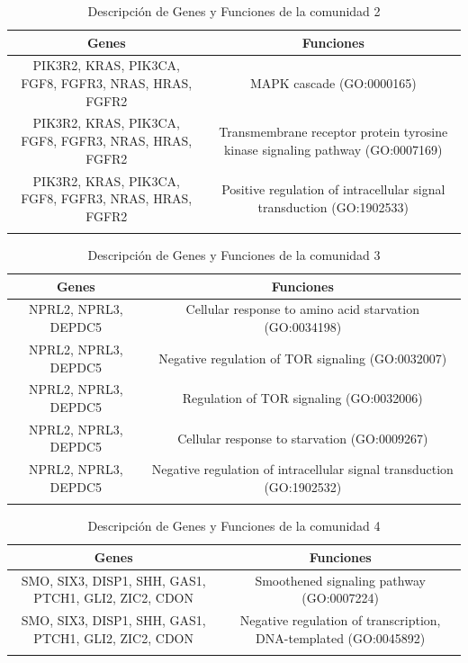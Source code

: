 \begin{table}[!]
 	\caption{Descripción de Genes y Funciones de la comunidad 2}
	\centering
	\begin{tabular}{|C|C|}
    \toprule
    \textbf{Genes} & \textbf{Funciones} \\
    \midrule
    PIK3R2, KRAS, PIK3CA, FGF8, FGFR3, NRAS, HRAS, FGFR2 & MAPK cascade (GO:0000165) \\
    PIK3R2, KRAS, PIK3CA, FGF8, FGFR3, NRAS, HRAS, FGFR2 & Transmembrane receptor protein tyrosine kinase signaling pathway (GO:0007169) \\
    PIK3R2, KRAS, PIK3CA, FGF8, FGFR3, NRAS, HRAS, FGFR2 & Positive regulation of intracellular signal transduction (GO:1902533) \\
    \bottomrule
    \label{tabla:genes_funciones2}
 	\end{tabular}
\end{table}



\begin{table}[!]
 	\caption{Descripción de Genes y Funciones de la comunidad 3}
	\centering
	\begin{tabular}{|C|C|}
    \toprule
    \textbf{Genes} & \textbf{Funciones} \\
    \midrule
    NPRL2, NPRL3, DEPDC5 & Cellular response to amino acid starvation (GO:0034198) \\
    NPRL2, NPRL3, DEPDC5 & Negative regulation of TOR signaling (GO:0032007) \\
    NPRL2, NPRL3, DEPDC5 & Regulation of TOR signaling (GO:0032006) \\
    NPRL2, NPRL3, DEPDC5 & Cellular response to starvation (GO:0009267) \\
    NPRL2, NPRL3, DEPDC5 & Negative regulation of intracellular signal transduction (GO:1902532) \\
    \bottomrule
    \label{tabla:genes_funciones3}
 	\end{tabular}
\end{table}

\begin{table}[!]
 	\caption{Descripción de Genes y Funciones de la comunidad 4}
	\centering
	\begin{tabular}{|C|C|}
    \toprule
    \textbf{Genes} & \textbf{Funciones} \\
    \midrule
    SMO, SIX3, DISP1, SHH, GAS1, PTCH1, GLI2, ZIC2, CDON & Smoothened signaling pathway (GO:0007224) \\
    SMO, SIX3, DISP1, SHH, GAS1, PTCH1, GLI2, ZIC2, CDON & Negative regulation of transcription, DNA-templated (GO:0045892) \\
    \bottomrule
    \label{tabla:genes_funciones4}
 	\end{tabular}
\end{table}




